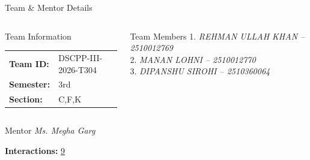 \documentclass[aspectratio=169,11pt]{beamer}
\newcommand{\placeholder}[1]{%
\textit{\color{GEUGrey}#1}
}
\begin{document}
\begin{frame}{Team \& Mentor Details}

\begin{columns}[T,totalwidth=\textwidth]


\begin{block}{Team Information}
\begin{tabular}{@{}ll@{}}
\textbf{Team ID:} & DSCPP-III-2026-T304\\
\textbf{Semester:} & 3rd\\
\textbf{Section:} & C,F,K\\
\end{tabular}
\end{block}


\begin{block}{Team Members}
1.\quad \placeholder{REHMAN ULLAH KHAN -- 2510012769}\\
2.\quad \placeholder{MANAN LOHNI -- 2510012770}\\
3.\quad \placeholder{DIPANSHU SIROHI -- 2510360064}\\
\end{block}

\end{columns}

\vspace{2mm}

\begin{block}{Mentor}
\placeholder{Ms. Megha Garg}
\hfill
\textbf{Interactions:} \underline{9\hspace{12mm}}
\end{block}

\vfill



\end{frame}

\end{document}
